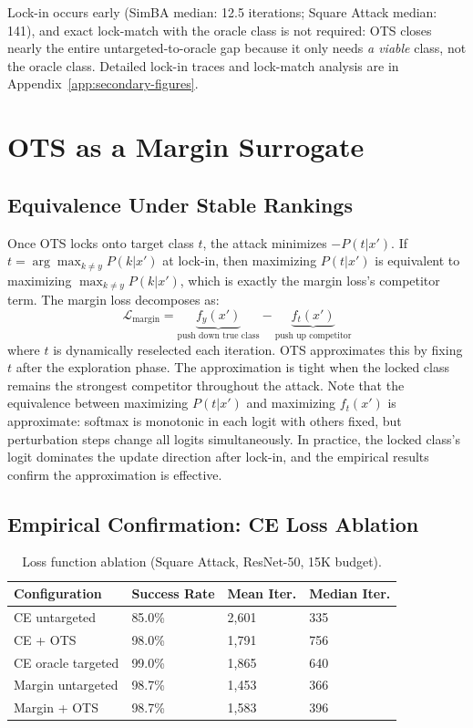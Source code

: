 \documentclass{cap2026}
\begin{document}
Lock-in occurs early (SimBA median: 12.5 iterations; Square Attack median: 141), and exact lock-match with the oracle class is not required: OTS closes nearly the entire untargeted-to-oracle gap because it only needs \textit{a viable} class, not the oracle class. Detailed lock-in traces and lock-match analysis are in Appendix~\ref{app:secondary-figures}.

\section{OTS as a Margin Surrogate}\label{sec:margin-surrogate}

\subsection{Equivalence Under Stable Rankings}\label{sec:equivalence}

Once OTS locks onto target class $t$, the attack minimizes $-P(t|x')$. If $t = \arg\max_{k \neq y} P(k|x')$ at lock-in, then maximizing $P(t|x')$ is equivalent to maximizing $\max_{k \neq y} P(k|x')$, which is exactly the margin loss's competitor term. The margin loss decomposes as:
\begin{equation}
\mathcal{L}_{\text{margin}} = \underbrace{f_y(x')}_{\text{push down true class}} - \underbrace{f_t(x')}_{\text{push up competitor}}
\end{equation}
where $t$ is dynamically reselected each iteration. OTS approximates this by fixing $t$ after the exploration phase. The approximation is tight when the locked class remains the strongest competitor throughout the attack. Note that the equivalence between maximizing $P(t|x')$ and maximizing $f_t(x')$ is approximate: softmax is monotonic in each logit with others fixed, but perturbation steps change all logits simultaneously. In practice, the locked class's logit dominates the update direction after lock-in, and the empirical results confirm the approximation is effective.

\subsection{Empirical Confirmation: CE Loss Ablation}\label{sec:loss-ablation}

\begin{table}[H]
\centering
\caption{Loss function ablation (Square Attack, ResNet-50, 15K budget).}
\label{tab:loss-ablation}
\small
\begin{tabular}{@{}llll@{}}
\toprule
Configuration & Success Rate & Mean Iter. & Median Iter. \\
\midrule
CE untargeted & 85.0\% & 2,601 & 335 \\
CE + OTS & 98.0\% & 1,791 & 756 \\
CE oracle targeted & 99.0\% & 1,865 & 640 \\
Margin untargeted & 98.7\% & 1,453 & 366 \\
Margin + OTS & 98.7\% & 1,583 & 396 \\
\bottomrule
\end{tabular}
\end{table}
\end{document}
